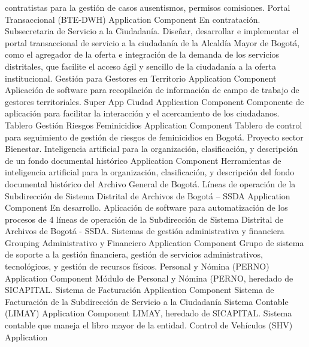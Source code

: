 \documentclass[
	a4paper, %
	12pt, %
]{include/CSSullivanBusinessReport}
\begin{document}
contratistas para la gestión de casos ausentismos, permisos comisiones.
\textbar{} \textbar{} Portal Transaccional (BTE-DWH) \textbar{}
Application Component \textbar{} En contratación. Subsecretaria de
Servicio a la Ciudadanía. Diseñar, desarrollar e implementar el portal
transaccional de servicio a la ciudadanía de la Alcaldía Mayor de
Bogotá, como el agregador de la oferta e integración de la demanda de
los servicios distritales, que facilite el acceso ágil y sencillo de la
ciudadanía a la oferta institucional. \textbar{} \textbar{} Gestión para
Gestores en Territorio \textbar{} Application Component \textbar{}
Aplicación de software para recopilación de información de campo de
trabajo de gestores territoriales. \textbar{} \textbar{} Super App
Ciudad \textbar{} Application Component \textbar{} Componente de
aplicación para facilitar la interacción y el acercamiento de los
ciudadanos. \textbar{} \textbar{} Tablero Gestión Riesgos Feminicidios
\textbar{} Application Component \textbar{} Tablero de control para
seguimiento de gestión de riesgos de feminicidios en Bogotá. Proyecto
sector Bienestar. \textbar{} \textbar{} Inteligencia artificial para la
organización, clasificación, y descripción de un fondo documental
histórico \textbar{} Application Component \textbar{} Herramientas de
inteligencia artificial para la organización, clasificación, y
descripción del fondo documental histórico del Archivo General de
Bogotá. \textbar{} \textbar{} Líneas de operación de la Subdirección de
Sistema Distrital de Archivos de Bogotá -- SSDA \textbar{} Application
Component \textbar{} En desarrollo. Aplicación de software para
automatización de los procesos de 4 líneas de operación de la
Subdirección de Sistema Distrital de Archivos de Bogotá - SSDA.
\textbar{} \textbar{} Sistemas de gestión administrativa y financiera
\textbar{} Grouping \textbar{} \textbar{} \textbar{} Administrativo y
Financiero \textbar{} Application Component \textbar{} Grupo de sistema
de soporte a la gestión financiera, gestión de servicios
administrativos, tecnológicos, y gestión de recursos físicos. \textbar{}
\textbar{} Personal y Nómina (PERNO) \textbar{} Application Component
\textbar{} Módulo de Personal y Nómina (PERNO, heredado de SICAPITAL.
\textbar{} \textbar{} Sistema de Facturación \textbar{} Application
Component \textbar{} Sistema de Facturación de la Subdirección de
Servicio a la Ciudadanía \textbar{} \textbar{} Sistema Contable (LIMAY)
\textbar{} Application Component \textbar{} LIMAY, heredado de
SICAPITAL. Sistema contable que maneja el libro mayor de la entidad.
\textbar{} \textbar{} Control de Vehículos (SHV) \textbar{} Application
\end{document}
